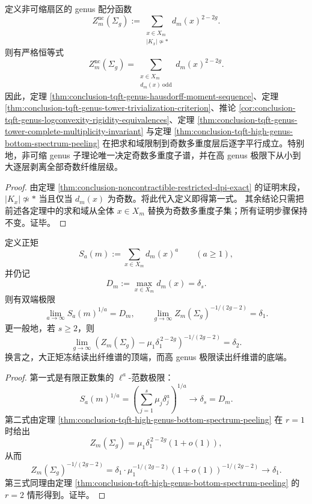 \begin{theorem}\label{thm:conclusion-tqft-noncontractible-genus-equals-odd-spectrum}
定义非可缩扇区的 genus 配分函数
\[
Z_m^{\mathrm{nc}}(\Sigma_g):=
\sum_{\substack{x\in X_m\\ |K_x|\not\simeq *}}d_m(x)^{2-2g}.
\]
则有严格恒等式
\[
Z_m^{\mathrm{nc}}(\Sigma_g)
=
\sum_{\substack{x\in X_m\\ d_m(x)\ \mathrm{odd}}}d_m(x)^{2-2g}.
\]
因此，定理 \ref{thm:conclusion-tqft-genus-hausdorff-moment-sequence}、定理 \ref{thm:conclusion-tqft-genus-tower-trivialization-criterion}、推论 \ref{cor:conclusion-tqft-genus-logconvexity-rigidity-equivalences}、定理 \ref{thm:conclusion-tqft-genus-tower-complete-multiplicity-invariant} 与定理 \ref{thm:conclusion-tqft-high-genus-bottom-spectrum-peeling} 在把求和域限制到奇数多重度层后逐字平行成立。特别地，非可缩 genus 子理论唯一决定奇数多重度子谱，并在高 genus 极限下从小到大逐层剥离全部奇数纤维层级。
\end{theorem}
\begin{proof}
由定理 \ref{thm:conclusion-noncontractible-restricted-dpi-exact} 的证明末段，\(|K_x|\not\simeq *\) 当且仅当 \(d_m(x)\) 为奇数。将此代入定义即得第一式。
其余结论只需把前述各定理中的求和域从全体 \(x\in X_m\) 替换为奇数多重度子集；所有证明步骤保持不变。证毕。
\end{proof}

\begin{theorem}[正矩冻结与高属剥离是纤维谱两端的对偶显微镜]\label{thm:conclusion-positive-moment-freezing-high-genus-peeling-duality}
定义正矩
\[
S_a(m):=\sum_{x\in X_m}d_m(x)^a
\qquad(a\ge 1),
\]
并仍记
\[
D_m:=\max_{x\in X_m}d_m(x)=\delta_s.
\]
则有双端极限
\[
\lim_{a\to\infty}S_a(m)^{1/a}=D_m,
\qquad
\lim_{g\to\infty}Z_m(\Sigma_g)^{-1/(2g-2)}=\delta_1.
\]
更一般地，若 \(s\ge 2\)，则
\[
\lim_{g\to\infty}
\left(
Z_m(\Sigma_g)-\mu_1\delta_1^{\,2-2g}
\right)^{-1/(2g-2)}
=
\delta_2.
\]
换言之，大正矩冻结读出纤维谱的顶端，而高 genus 极限读出纤维谱的底端。
\end{theorem}
\begin{proof}
第一式是有限正数集的 \(\ell^a\)-范数极限：
\[
S_a(m)^{1/a}
=
\left(\sum_{j=1}^{s}\mu_j\delta_j^a\right)^{1/a}\to \delta_s=D_m.
\]
第二式由定理 \ref{thm:conclusion-tqft-high-genus-bottom-spectrum-peeling} 在 \(r=1\) 时给出
\[
Z_m(\Sigma_g)=\mu_1\delta_1^{\,2-2g}(1+o(1)),
\]
从而
\[
Z_m(\Sigma_g)^{-1/(2g-2)}
=
\delta_1\cdot \mu_1^{-1/(2g-2)}(1+o(1))^{-1/(2g-2)}
\to \delta_1.
\]
第三式同理由定理 \ref{thm:conclusion-tqft-high-genus-bottom-spectrum-peeling} 的 \(r=2\) 情形得到。证毕。
\end{proof}

